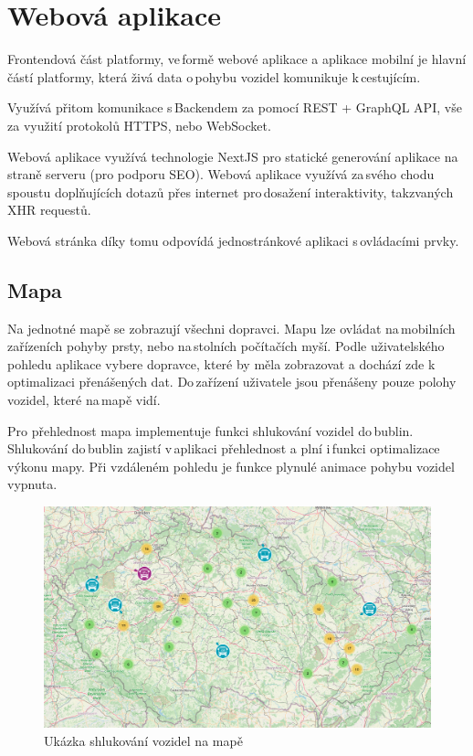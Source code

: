 \section{Webová aplikace}

Frontendová část platformy, ve\,formě webové aplikace a aplikace mobilní je hlavní částí platformy, která živá data o\,pohybu vozidel komunikuje k\,cestujícím.

Využívá přitom komunikace s\,Backendem za pomocí REST + GraphQL API, vše za využití protokolů HTTPS, nebo WebSocket.

Webová aplikace využívá technologie NextJS pro statické generování aplikace na\,straně serveru (pro podporu SEO).
Webová aplikace využívá za\,svého chodu spoustu doplňujících dotazů přes internet pro\,dosažení interaktivity, takzvaných XHR requestů.

Webová stránka díky tomu odpovídá jednostránkové aplikaci s\,ovládacími prvky.

\subsection{Mapa}
Na jednotné mapě se zobrazují všechni dopravci.
Mapu lze ovládat na\,mobilních zařízeních pohyby prsty, nebo na\,stolních počítačích myší. Podle uživatelského pohledu aplikace vybere dopravce, které by měla zobrazovat a dochází zde k\,optimalizaci přenášených dat. Do\,zařízení uživatele jsou přenášeny pouze polohy vozidel, které na\,mapě vidí.

Pro přehlednost mapa implementuje funkci shlukování vozidel do\,bublin. Shlukování do\,bublin zajistí v\,aplikaci přehlednost a plní i\,funkci optimalizace výkonu mapy.
Při vzdáleném pohledu je funkce plynulé animace pohybu vozidel vypnuta.
\begin{figure}[H]
    \centering
    \includegraphics[width=1\textwidth]{images/global_map.png}
    \caption{Ukázka shlukování vozidel na mapě}
    \label{shlukovani}
\end{figure}

